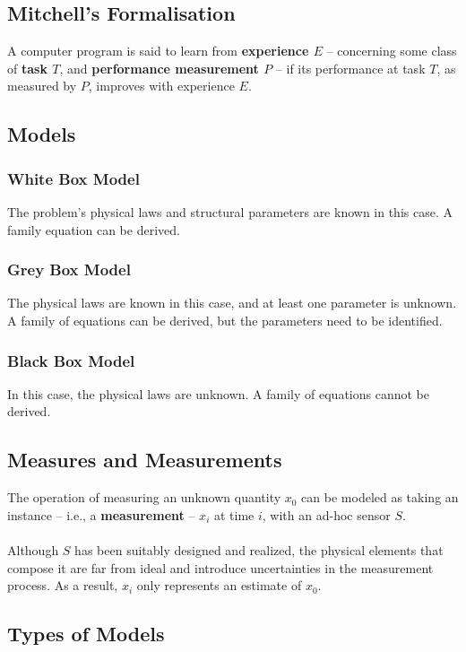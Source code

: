 \documentclass{article}
\begin{document}
\subsection{Mitchell's Formalisation}
A computer program is said to learn from \textbf{experience $E$} -- concerning some class of \textbf{task $T$}, and \textbf{performance measurement $P$} -- if its performance at task $T$, as measured by $P$, improves with experience $E$.

\subsection{Models}
\subsubsection{White Box Model}
The problem's physical laws and structural parameters are known in this case. A family equation can be derived.

\subsubsection{Grey Box Model}
The physical laws are known in this case, and at least one parameter is unknown. A family of equations can be derived, but the parameters need to be identified.

\subsubsection{Black Box Model}
In this case, the physical laws are unknown. A family of equations cannot be derived.

\subsection{Measures and Measurements}
The operation of measuring an unknown quantity $x_0$ can be modeled as taking an instance -- i.e., a \textbf{measurement} -- $x_i$ at time $i$, with an ad-hoc sensor $S$. \\ \\
Although $S$ has been suitably designed and realized, the physical elements that compose it are far from ideal and introduce uncertainties in the measurement process. As a result, $x_i$ only represents an estimate of $x_0$.

\subsection{Types of Models}
\end{document}
